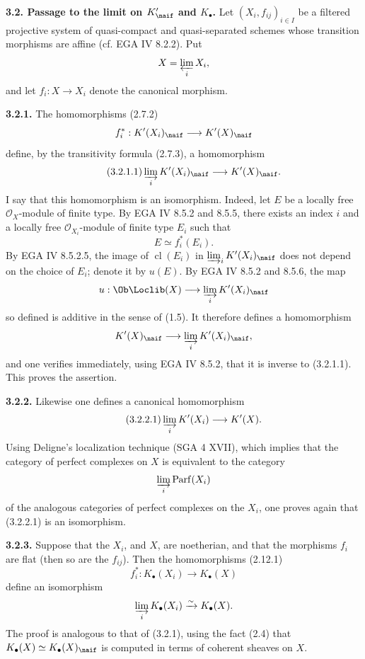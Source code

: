 \documentclass[11pt]{article}
\newcommand{\cl}{\operatorname{cl}}
\newcommand{\Parf}{\operatorname{Parf}}
\begin{document}
\textbf{3.2. Passage to the limit on \(K'_{\naif}\) and \(K_{\bullet}\).} Let \((X_i,f_{ij})_{i\in I}\) be a filtered projective system of quasi-compact and quasi-separated schemes whose transition morphisms are affine (cf. EGA IV 8.2.2). Put
\[
 X=\varprojlim_i X_i,
\]
and let \(f_i:X\to X_i\) denote the canonical morphism.

\textbf{3.2.1.} The homomorphisms (2.7.2)
\[
 f_i^*:K'(X_i)_{\naif}\longrightarrow K'(X)_{\naif}
\]
define, by the transitivity formula (2.7.3), a homomorphism
\begin{equation}\tag{3.2.1.1}
 \varinjlim_i K'(X_i)_{\naif}\longrightarrow K'(X)_{\naif}.
\end{equation}
I say that this homomorphism is an isomorphism. Indeed, let \(E\) be a locally free \(\mathcal O_X\)-module of finite type. By EGA IV 8.5.2 and 8.5.5, there exists an index \(i\) and a locally free \(\mathcal O_{X_i}\)-module of finite type \(E_i\) such that
\[
 E\simeq f_i^*(E_i).
\]
By EGA IV 8.5.2.5, the image of \(\cl(E_i)\) in \(\varinjlim_i K'(X_i)_{\naif}\) does not depend on the choice of \(E_i\); denote it by \(u(E)\). By EGA IV 8.5.2 and 8.5.6, the map
\[
 u:\Ob\Loclib(X)\longrightarrow \varinjlim_i K'(X_i)_{\naif}
\]
so defined is additive in the sense of (1.5). It therefore defines a homomorphism
\[
 K'(X)_{\naif}\longrightarrow \varinjlim_i K'(X_i)_{\naif},
\]
and one verifies immediately, using EGA IV 8.5.2, that it is inverse to (3.2.1.1). This proves the assertion.

\textbf{3.2.2.} Likewise one defines a canonical homomorphism
\begin{equation}\tag{3.2.2.1}
 \varinjlim_i K'(X_i)\longrightarrow K'(X).
\end{equation}
Using Deligne's localization technique (SGA 4 XVII), which implies that the category of perfect complexes on \(X\) is equivalent to the category
\[
 \varinjlim_i \Parf(X_i)
\]
of the analogous categories of perfect complexes on the \(X_i\), one proves again that (3.2.2.1) is an isomorphism.

\textbf{3.2.3.} Suppose that the \(X_i\), and \(X\), are noetherian, and that the morphisms \(f_i\) are flat (then so are the \(f_{ij}\)). Then the homomorphisms (2.12.1)
\[
 f_i^*:K_{\bullet}(X_i)\longrightarrow K_{\bullet}(X)
\]
define an isomorphism
\[
 \varinjlim_i K_{\bullet}(X_i)\xrightarrow{\sim}K_{\bullet}(X).
\]
The proof is analogous to that of (3.2.1), using the fact (2.4) that \(K_{\bullet}(X)\simeq K_{\bullet}(X)_{\naif}\) is computed in terms of coherent sheaves on \(X\).
\end{document}
